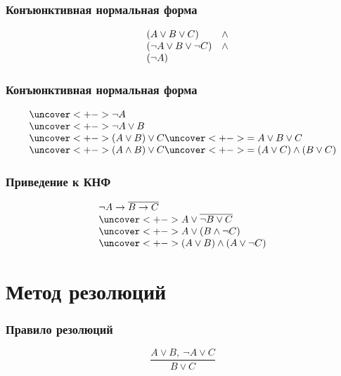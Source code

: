 \documentclass[24pt,pdf,hyperref={unicode}]{beamer}
\begin{document}
\begin{frame}\frametitle{Конъюнктивная нормальная форма}

$$
\begin{array}{l l l}
& (A \vee B \vee C) & \wedge \\
& (\neg A \vee B \vee \neg C) & \wedge \\
& (\neg A)
\end{array}
$$
\end{frame}

\begin{frame}\frametitle{Конъюнктивная нормальная форма}
$$
\begin{array}{l}
\uncover<+->{ \neg A } \\
\uncover<+->{ \neg A \vee B } \\
\uncover<+->{ (A \vee B) \vee C } \uncover<+->{ = A\vee B\vee C }\\
\uncover<+->{ (A \wedge B) \vee C } \uncover<+->{ = (A\vee C)\wedge (B\vee C)}\\
\end{array}
$$
\end{frame}

\begin{frame}\frametitle{Приведение к КНФ}
$$
\begin{array}{l}
\neg A\rightarrow \overline{B\rightarrow C} \\
\uncover<+->{ A \vee \overline{\neg B \vee C }} \\
\uncover<+->{ A \vee (B \wedge \neg C) } \\
\uncover<+->{ (A\vee B) \wedge (A \vee \neg C) }
\end{array}
$$
\end{frame}

\section{Метод резолюций}

\begin{frame}\frametitle{Правило резолюций}
{\huge
$$
\frac{A\vee B,\ \neg A \vee C}{B \vee C}
$$
}
\end{frame}
\end{document}
